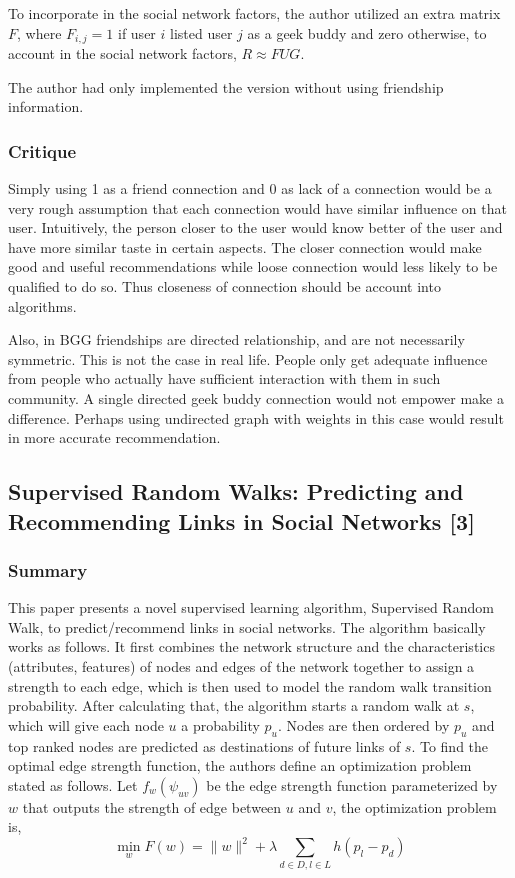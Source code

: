 \documentclass{article}
\begin{document}
To incorporate in the social network factors, the author utilized an extra matrix $F$, where $F_{i,j} = 1$ if user $i$ listed user $j$ as a geek buddy and zero otherwise, to account in the social network factors, $R\approx FUG $.

The author had only implemented the version without using friendship information.

\subsubsection{Critique}
Simply using 1 as a friend connection and 0 as lack of a connection would be a very rough assumption that each connection would have similar influence on that user. Intuitively, the person closer to the user would know better of the user and have more similar taste in certain aspects. The closer connection would make good and useful recommendations while loose connection would less likely to be qualified to do so. Thus closeness of connection should be account into algorithms.

Also, in BGG friendships are directed relationship, and are not necessarily symmetric. This is not the case in real life. People only get adequate influence from people who actually have sufficient interaction with them in such community. A single directed geek buddy connection would not empower make a difference. Perhaps using undirected graph with weights in this case would result in more accurate recommendation.


\subsection{Supervised Random Walks: Predicting and Recommending Links in Social Networks [3]}

\subsubsection{Summary}
This paper presents a novel supervised learning algorithm, Supervised Random Walk, to predict/recommend links in social networks. The algorithm basically works as follows. It first combines the network structure and the characteristics (attributes, features) of nodes and edges of the network together to assign a strength to each edge, which is then used to model the random walk transition probability. After calculating that, the algorithm starts a random walk at $s$, which will give each node $u$ a probability $p_u$. Nodes are then ordered by $p_u$ and top ranked nodes are predicted as destinations of future links of $s$. To find the optimal edge strength function, the authors define an optimization problem stated as follows. Let $f_w(\psi_{uv})$ be the edge strength function parameterized by $w$ that outputs the strength of edge between $u$ and $v$, the optimization problem is,
\begin{equation}
\min_w F(w)=\parallel w\parallel^2+\lambda\sum_{d\in D, l\in L}h(p_l-p_d)
\end{equation}
\end{document}
